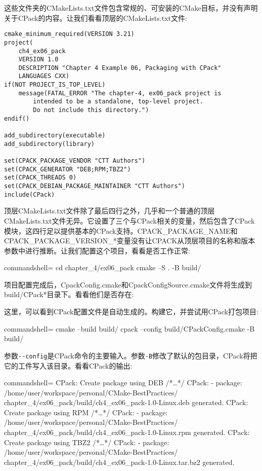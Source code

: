 这些文件夹的CMakeLists.txt文件包含常规的、可安装的CMake目标，并没有声明关于CPack的内容。让我们看看顶层的CMakeLists.txt文件:

\begin{lstlisting}[style=styleCMake]
cmake_minimum_required(VERSION 3.21)
project(
	ch4_ex06_pack
	VERSION 1.0
	DESCRIPTION "Chapter 4 Example 06, Packaging with CPack"
	LANGUAGES CXX)
if(NOT PROJECT_IS_TOP_LEVEL)
	message(FATAL_ERROR "The chapter-4, ex06_pack project is
		intended to be a standalone, top-level project.
		Do not include this directory.")
endif()

add_subdirectory(executable)
add_subdirectory(library)

set(CPACK_PACKAGE_VENDOR "CTT Authors")
set(CPACK_GENERATOR "DEB;RPM;TBZ2")
set(CPACK_THREADS 0)
set(CPACK_DEBIAN_PACKAGE_MAINTAINER "CTT Authors")
include(CPack)
\end{lstlisting}

顶层CMakeLists.txt文件除了最后四行之外，几乎和一个普通的顶层CMakeLists.txt文件无异。它设置了三个与CPack相关的变量，然后包含了CPack模块，这四行足以提供基本的CPack支持。CPACK\_PACKAGE\_NAME和CPACK\_PACKAGE\_VERSION\_*变量没有让CPACK从顶层项目的名称和版本参数中进行推断。让我们配置这个项目，看看是否工作正常:

\begin{tcblisting}{commandshell={}}
cd chapter_4/ex06_pack
cmake –S . -B build/
\end{tcblisting}

项目配置完成后，CpackConfig.cmake和CpackConfigSource.cmake文件将生成到build/CPack*目录下。看看他们是否存在:


这里，可以看到CPack配置文件是自动生成的。构建它，并尝试用CPack打包项目:

\begin{tcblisting}{commandshell={}}
cmake --build build/
cpack --config build/CPackConfig.cmake -B build/
\end{tcblisting}

参数\texttt{-{}-config}是CPack命令的主要输入。参数\texttt{-B}修改了默认的包目录，CPack将把它的工件写入该目录。看看CPack的输出:

\begin{tcblisting}{commandshell={}}
CPack: Create package using DEB
/*…*/
CPack: - package: /home/user/workspace/personal/CMake-BestPractices/
chapter_4/ex06_pack/build/ch4_ex06_pack-1.0-Linux.deb
generated.
CPack: Create package using RPM
/*…*/
CPack: - package: /home/user/workspace/personal/CMake-BestPractices/
chapter_4/ex06_pack/build/ch4_ex06_pack-1.0-Linux.rpm
generated.
CPack: Create package using TBZ2
/*…*/
CPack: - package: /home/user/workspace/personal/CMake-BestPractices/
chapter_4/ex06_pack/build/ch4_ex06_pack-1.0-Linux.tar.bz2 
generated.
\end{tcblisting}

